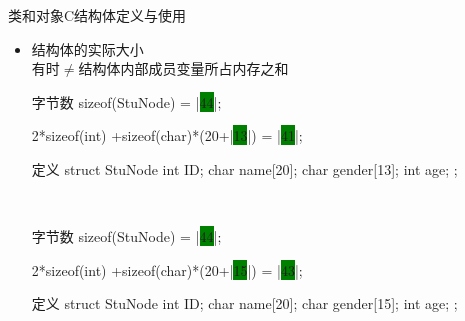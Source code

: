 \begin{frame}[fragile]{类和对象}{C结构体定义与使用}%
  \begin{spacing}{1.3}
  \begin{itemize}
  \item 结构体的实际大小\\
    {\tiny 有时$\neq$结构体内部成员变量所占内存之和}\\
    \begin{center}
      \begin{minipage}{0.45\linewidth}
        \begin{cpptcb}[||]{字节数}
sizeof(StuNode) = |\colorbox{green}{44}|;

2*sizeof(int)
+sizeof(char)*(20+|\colorbox{green}{13}|)
= |\colorbox{green}{41}|;
        \end{cpptcb}
      \end{minipage}\qquad
      \begin{minipage}{0.38\linewidth}
        \begin{cpptcb}{定义}
struct StuNode{
    int ID;
    char name[20];
    char gender[13];
    int age;
};
        \end{cpptcb}
      \end{minipage}\\
      \begin{minipage}{0.45\linewidth}
        \begin{cpptcb}[||]{字节数}
sizeof(StuNode) = |\colorbox{green}{44}|;

2*sizeof(int)
+sizeof(char)*(20+|\colorbox{green}{15}|)
= |\colorbox{green}{43}|;
        \end{cpptcb}
      \end{minipage}\qquad
      \begin{minipage}{0.38\linewidth}
        \begin{cpptcb}{定义}
struct StuNode{
    int ID;
    char name[20];
    char gender[15];
    int age;
};
        \end{cpptcb}
      \end{minipage}
    \end{center}
  \end{itemize}
  \end{spacing}
\end{frame}

